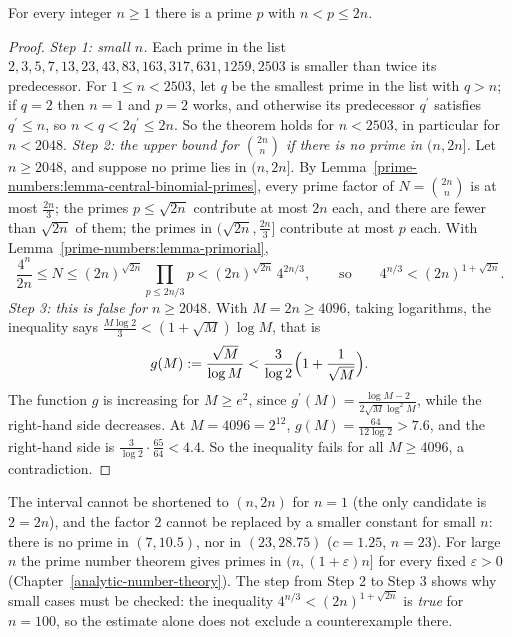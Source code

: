 \begin{theorem}\label{prime-numbers:theorem-bertrand}
For every integer $n \geq 1$ there is a prime $p$ with $n < p \leq 2n$.
\end{theorem}

\begin{proof}
\emph{Step 1: small $n$.} Each prime in the list $2, 3, 5, 7, 13, 23, 43, 83, 163, 317, 631, 1259, 2503$ is smaller than twice its predecessor. For $1 \leq n < 2503$, let $q$ be the smallest prime in
the list with $q > n$; if $q = 2$ then $n = 1$ and $p = 2$ works, and otherwise its predecessor $q^{\prime}$ satisfies $q^{\prime} \leq n$, so $n < q < 2q^{\prime} \leq 2n$. So the theorem holds for
$n < 2503$, in particular for $n < 2048$.
\emph{Step 2: the upper bound for $\binom{2n}{n}$ if there is no prime in $(n, 2n]$.} Let $n \geq 2048$, and suppose no prime lies in $(n, 2n]$. By
Lemma~\ref{prime-numbers:lemma-central-binomial-primes}, every prime factor of $N = \binom{2n}{n}$ is at most $\frac{2n}{3}$; the primes $p \leq \sqrt{2n}$ contribute at most $2n$ each, and there
are fewer than $\sqrt{2n}$ of them; the primes in $(\sqrt{2n}, \frac{2n}{3}]$ contribute at most $p$ each. With Lemma~\ref{prime-numbers:lemma-primorial},
\[
\frac{4^n}{2n} \leq N \leq (2n)^{\sqrt{2n}}\prod_{p \leq 2n/3}p < (2n)^{\sqrt{2n}}\,4^{2n/3}, \qquad\text{so}\qquad 4^{n/3} < (2n)^{1 + \sqrt{2n}}.
\]
\emph{Step 3: this is false for $n \geq 2048$.} With $M = 2n \geq 4096$, taking logarithms, the inequality says $\frac{M\log 2}{3} < (1 + \sqrt{M})\log M$, that is
\[
g(M) := \frac{\sqrt{M}}{\log M} < \frac{3}{\log 2}\Bigl(1 + \frac{1}{\sqrt{M}}\Bigr).
\]
The function $g$ is increasing for $M \geq e^2$, since $g^{\prime}(M) = \frac{\log M - 2}{2\sqrt{M}\log^2 M}$, while the right-hand side decreases. At $M = 4096 = 2^{12}$, $g(M) = \frac{64}{12\log 2} > 7.6$,
and the right-hand side is $\frac{3}{\log 2} \cdot \frac{65}{64} < 4.4$. So the inequality fails for all $M \geq 4096$, a contradiction.
\end{proof}

\begin{counterexample}\label{prime-numbers:counterexample-bertrand-sharp}
The interval cannot be shortened to $(n, 2n)$ for $n = 1$ (the only candidate is $2 = 2n$), and the factor $2$ cannot be replaced by a smaller constant for small $n$: there is no prime in
$(7, 10.5)$, nor in $(23, 28.75)$ ($c = 1.25$, $n = 23$). For large $n$ the prime number theorem gives primes in $(n, (1 + \varepsilon)n]$ for every fixed $\varepsilon > 0$
(Chapter~\ref{analytic-number-theory}). The step from Step 2 to Step 3 shows why small cases must be checked: the inequality $4^{n/3} < (2n)^{1 + \sqrt{2n}}$ is \emph{true} for $n = 100$, so the
estimate alone does not exclude a counterexample there.
\end{counterexample}

